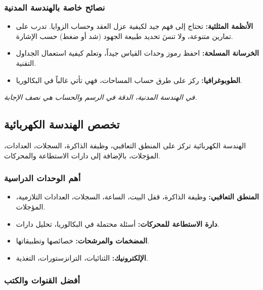 \documentclass[12pt,a4paper]{book}
\newcommand{\quoteAr}[1]{%
	\begin{myquote}
		\itshape #1
	\end{myquote}
}
\begin{document}
\subsubsection{نصائح خاصة بالهندسة المدنية}

\begin{itemize}
	\item \textbf{الأنظمة المثلثية:} تحتاج إلى فهم جيد لكيفية عزل العقد وحساب الزوايا. تدرب على تمارين متنوعة، ولا تنسَ تحديد طبيعة الجهود (شد أو ضغط) حسب الإشارة.
	\item \textbf{الخرسانة المسلحة:} احفظ رموز وحدات القياس جيداً، وتعلم كيفية استعمال الجداول التقنية.
	\item \textbf{الطوبوغرافيا:} ركز على طرق حساب المساحات، فهي تأتي غالباً في البكالوريا.
\end{itemize}

\quoteAr{في الهندسة المدنية، الدقة في الرسم والحساب هي نصف الإجابة.}

\subsection{تخصص الهندسة الكهربائية}

الهندسة الكهربائية تركز على المنطق التعاقبي، وظيفة الذاكرة، السجلات، العدادات، المؤجلات، بالإضافة إلى دارات الاستطاعة والمحركات.

\subsubsection{أهم الوحدات الدراسية}

\begin{itemize}
	\item \textbf{المنطق التعاقبي:} وظيفة الذاكرة، قفل البيت، الساعة، السجلات، العدادات التلازمية، المؤجلات.
	\item \textbf{دارة الاستطاعة للمحركات:} أسئلة محتملة في البكالوريا، تحليل دارات.
	\item \textbf{المضخمات والمرشحات:} خصائصها وتطبيقاتها.
	\item \textbf{الإلكترونيك:} الثنائيات، الترانزستورات، التغذية.
\end{itemize}

\subsubsection{أفضل القنوات والكتب}
\end{document}
